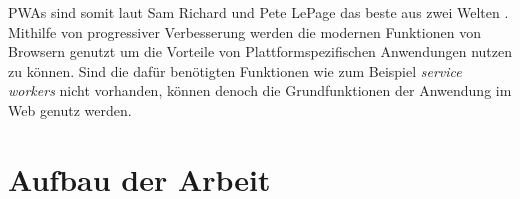 PWAs sind somit laut Sam Richard und Pete LePage das beste aus zwei Welten \cite{SamRichard2020}. Mithilfe von progressiver Verbesserung werden die modernen Funktionen von Browsern genutzt um die Vorteile von Plattformspezifischen Anwendungen nutzen zu können. Sind die dafür benötigten Funktionen wie zum Beispiel \textit{service workers} nicht vorhanden, können denoch die Grundfunktionen der Anwendung im Web genutz werden. 

\section{Aufbau der Arbeit}\label{se:AufbauDerArbeit}
